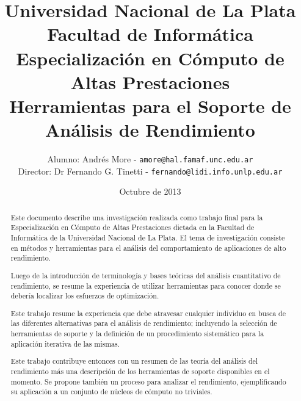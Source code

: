 \documentclass[a4paper]{report}
\begin{document}
\title{Universidad Nacional de La Plata\\Facultad de Informática\\ \bigskip
  Especialización en Cómputo de Altas Prestaciones\\ \bigskip
  Herramientas para el Soporte de Análisis de Rendimiento}

\author{
  Alumno: Andrés More - {\tt amore@hal.famaf.unc.edu.ar}\\
  Director: Dr Fernando G. Tinetti - {\tt fernando@lidi.info.unlp.edu.ar}
}

\date{Octubre de 2013}

\maketitle

\begin{abstract}

 Este documento describe una investigación realizada como trabajo final para la Especialización en Cómputo de Altas Prestaciones dictada en la Facultad de Informática de la Universidad Nacional de La Plata. El tema de investigación consiste en métodos y herramientas para el análisis del comportamiento de aplicaciones de alto rendimiento.

  \bigskip

  Luego de la introducción de terminología y bases teóricas del análisis cuantitativo de rendimiento, se resume la experiencia de utilizar herramientas para conocer donde se debería localizar los esfuerzos de optimización.

  \bigskip

  Este trabajo resume la experiencia que debe atravesar cualquier
  individuo en busca de las diferentes alternativas para el análisis de
  rendimiento; incluyendo la selección de herramientas de soporte y la
  definición de un procedimiento sistemático para la aplicación iterativa
  de las mismas.

  \bigskip

  Este trabajo contribuye entonces con un resumen de las teoría del análisis del
  rendimiento más una descripción de los herramientas de soporte 
  disponibles en el momento. Se propone también un proceso para analizar el
  rendimiento, ejemplificando su aplicación a un conjunto de núcleos de
  cómputo no triviales.

\end{abstract}

\tableofcontents
\end{document}
